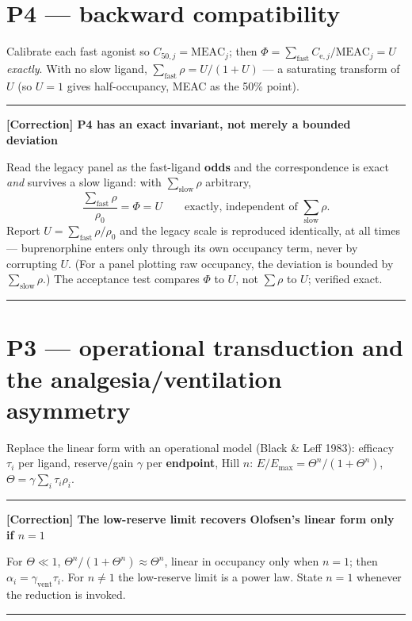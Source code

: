 \documentclass[11pt]{article}
\newenvironment{correction}[1]
  {\par\vspace{0.3em}\noindent\textcolor{corrcol}{\rule{\linewidth}{0.4pt}}\par
   \noindent\textbf{\textcolor{corrcol}{[Correction] #1}}\par\nopagebreak\vspace{0.2em}}
  {\par\noindent\textcolor{corrcol}{\rule{\linewidth}{0.4pt}}\par\vspace{0.3em}}
\newcommand{\Cesub}[1]{C_{\mathrm{e},#1}}
\newcommand{\rhoz}{\rho_0}
\begin{document}
\section{P4 --- backward compatibility}
\label{sec:p4}

Calibrate each fast agonist so $C_{50,j}=\mathrm{MEAC}_j$; then
$\Phi=\sum_{\mathrm{fast}}\Cesub{j}/\mathrm{MEAC}_j=U$ \emph{exactly}. With no slow
ligand, $\sum_{\mathrm{fast}}\rho=U/(1+U)$ --- a saturating transform of $U$
(so $U=1$ gives half-occupancy, MEAC as the 50\% point).

\begin{correction}{P4 has an exact invariant, not merely a bounded deviation}
Read the legacy panel as the fast-ligand \textbf{odds} and the correspondence is
exact \emph{and} survives a slow ligand: with $\sum_{\mathrm{slow}}\rho$ arbitrary,
%
\begin{equation}
\frac{\sum_{\mathrm{fast}}\rho}{\rhoz}=\Phi=U
\qquad\text{exactly, independent of }\textstyle\sum_{\mathrm{slow}}\rho.
\label{eq:invariant}
\end{equation}
%
Report $U=\sum_{\mathrm{fast}}\rho/\rhoz$ and the legacy scale is reproduced
identically, at all times --- buprenorphine enters only through its own occupancy
term, never by corrupting $U$. (For a panel plotting raw occupancy, the deviation
is bounded by $\sum_{\mathrm{slow}}\rho$.) The acceptance test compares $\Phi$ to
$U$, not $\sum\rho$ to $U$; verified exact.
\end{correction}

\section{P3 --- operational transduction and the analgesia/ventilation asymmetry}

Replace the linear form with an operational model (Black \& Leff 1983): efficacy
$\tau_i$ per ligand, reserve/gain $\gamma$ per \textbf{endpoint}, Hill $n$:
$E/E_{\max}=\Theta^n/(1+\Theta^n)$, $\Theta=\gamma\sum_i\tau_i\rho_i$.

\begin{correction}{The low-reserve limit recovers Olofsen's linear form only if $n=1$}
For $\Theta\ll1$, $\Theta^n/(1+\Theta^n)\approx\Theta^n$, linear in occupancy only
when $n=1$; then $\alpha_i=\gamma_{\mathrm{vent}}\tau_i$. For $n\ne1$ the low-reserve
limit is a power law. State $n=1$ whenever the reduction is invoked.
\end{correction}
\end{document}
